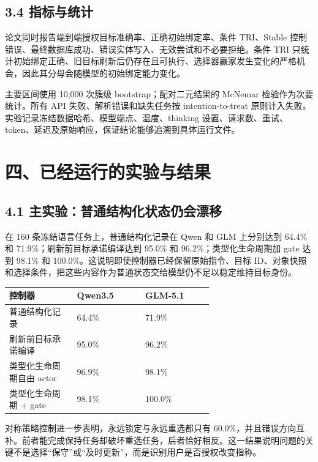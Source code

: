 \documentclass[10.5pt,fontset=none]{ctexart}
\begin{document}
\subsection{3.4 指标与统计}
\par 论文同时报告端到端授权目标准确率、正确初始绑定率、条件 TRI、Stable 控制错误、最终数据库成功、错误实体写入、无效尝试和不必要拒绝。条件 TRI 只统计初始绑定正确、旧目标刷新后仍存在且可执行、选择器赢家发生变化的严格机会，因此其分母会随模型的初始绑定能力变化。
\par 主要区间使用 10,000 次簇级 bootstrap；配对二元结果的 McNemar 检验作为次要统计。所有 API 失败、解析错误和缺失任务按 intention-to-treat 原则计入失败。实验记录冻结数据哈希、模型端点、温度、thinking 设置、请求数、重试、token、延迟及原始响应，保证结论能够追溯到具体运行文件。
\section{四、已经运行的实验与结果}
\subsection{4.1 主实验：普通结构化状态仍会漂移}
\par 在 160 条冻结语言任务上，普通结构化记录在 Qwen 和 GLM 上分别达到 64.4\% 和 71.9\%；刷新前目标承诺编译达到 95.0\% 和 96.2\%；类型化生命周期加 gate 达到 98.1\% 和 100.0\%。这说明即使控制器已经保留原始指令、目标 ID、对象快照和选择条件，把这些内容作为普通状态交给模型仍不足以稳定维持目标身份。
\begin{longtable}{@{}p{0.220\linewidth} p{0.220\linewidth} p{0.220\linewidth}@{}}
\toprule
控制器 & Qwen3.5 & GLM-5.1 \\
\midrule\endhead
普通结构化记录 & 64.4\% & 71.9\% \\
刷新前目标承诺编译 & 95.0\% & 96.2\% \\
类型化生命周期自由 actor & 96.9\% & 98.1\% \\
类型化生命周期 + gate & 98.1\% & 100.0\% \\
\bottomrule
\end{longtable}

\par 对称策略控制进一步表明，永远锁定与永远重选都只有 60.0\%，并且错误方向互补。前者能完成保持任务却破坏重选任务，后者恰好相反。这一结果说明问题的关键不是选择“保守”或“及时更新”，而是识别用户是否授权改变指称。
\end{document}
